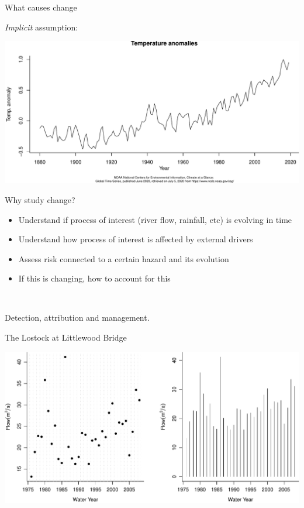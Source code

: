 \documentclass[
  10pt,
  ignorenonframetext,
  compress]{beamer}
\providecommand{\tightlist}{%
  \setlength{\itemsep}{0pt}\setlength{\parskip}{0pt}}
\begin{document}
\begin{frame}{What causes change}
\protect\hypertarget{what-causes-change-2}{}

\emph{Implicit} assumption:

\includegraphics{ProsdocimiPerugia_files/figure-beamer/unnamed-chunk-1-1.pdf}

\end{frame}

\begin{frame}{Why study change?}
\protect\hypertarget{why-study-change}{}

\begin{itemize}
\tightlist
\item
  Understand if process of interest (river flow, rainfall, etc) is
  evolving in time
\item
  Understand how process of interest is affected by external drivers
\item
  Assess risk connected to a certain hazard and its evolution
\item
  If this is changing, how to account for this
\end{itemize}

~

Detection, \pause attribution \pause and management.

\end{frame}

\begin{frame}{The Lostock at Littlewood Bridge}
\protect\hypertarget{the-lostock-at-littlewood-bridge}{}

\includegraphics{ProsdocimiPerugia_files/figure-beamer/LostockData-1.pdf}

\end{frame}
\end{document}
